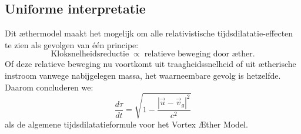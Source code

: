 \subsection*{Uniforme interpretatie}

Dit æthermodel maakt het mogelijk om alle relativistische tijdsdilatatie-effecten te zien als gevolgen van één principe:
\[
    \text{Kloksnelheidsreductie} \;\propto\; \text{relatieve beweging door æther}.
\]
Of deze relatieve beweging nu voortkomt uit traagheidssnelheid of uit ætherische instroom vanwege nabijgelegen massa, het waarneembare gevolg is hetzelfde. Daarom concluderen we:
\[
    \boxed{\frac{d\tau}{dt} = \sqrt{1 - \frac{|\vec{u} - \vec{v}_g|^2}{c^2}}}
\]
als de algemene tijdsdilatatieformule voor het Vortex Æther Model.